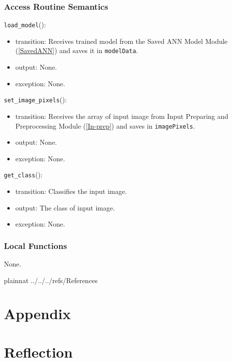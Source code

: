 \documentclass[12pt, titlepage]{article}
\def\code#1{\texttt{#1}}
\begin{document}
\subsubsection{Access Routine Semantics}

\noindent \code{load\_model}():
\begin{itemize}
  \item transition: Receives trained model from the Saved ANN Model Module (\ref{SavedANN}) 
  and saves it in \code{modelData}.
  \item output: None.
  \item exception: None.
\end{itemize}

\noindent \code{set\_image\_pixels}():
\begin{itemize}
  \item transition: Receives the array of input image from Input Preparing and Preprocessing Module (\ref{In-prep}) 
  and saves in \code{imagePixels}.
  \item output: None.
  \item exception: None.
\end{itemize}

\noindent \code{get\_class}():
\begin{itemize}
  \item transition: Classifies the input image.
  \item output: The class of input image.
  \item exception: None.
\end{itemize}


\subsubsection{Local Functions}
None.



\newpage

 {plainnat}
 {../../../refs/References}

\newpage

\section{Appendix} \label{Appendix}


\section{Reflection}
\end{document}
